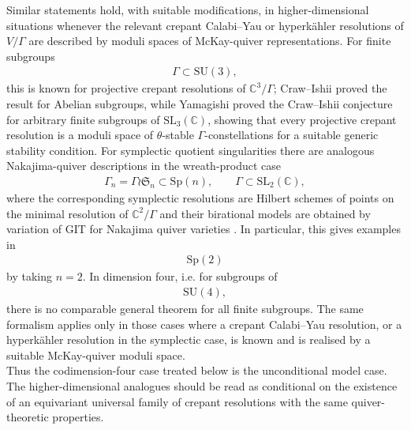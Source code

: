 \documentclass[psamsfonts]{amsart}
\theoremstyle{plain}
\theoremstyle{definition}{
\newtheorem{defi}{Definition}[section]
\newtheorem{ass}{Assumption}
\newtheorem*{nota}{Notation}}
\theoremstyle{remark}{
\newtheorem{rem}{Remark}
\newtheorem{ex}{Example}}
\theoremstyle{plain}{
\newtheorem{thm}{Theorem}[section]
\newtheorem{lem}{Lemma}[section]
\newtheorem{cor}{Corollary}[section]
\newtheorem{prop}{Proposition}[section]
\newtheorem{con}{Conjecture}[section]}
\newcommand{\m}[1]{{\mathrm{#1}}}
\begin{document}
Similar statements hold, with suitable modifications, in higher-dimensional situations whenever the relevant crepant Calabi--Yau or hyperkähler resolutions of $V/\Gamma$ are described by moduli spaces of McKay-quiver representations. For finite subgroups
\begin{align*}
\Gamma\subset \m{SU}(3),
\end{align*}
this is known for projective crepant resolutions of $\mathbb{C}^3/\Gamma$; Craw--Ishii \cite{craw2004flops} proved the result for Abelian subgroups, while Yamagishi\cite{yamagishi2025moduliI,yamagishi2025moduliII} proved the Craw--Ishii conjecture for arbitrary finite subgroups of
$\m{SL}_3(\mathbb{C})$, showing that every projective crepant resolution is a moduli space of $\theta$-stable $\Gamma$-constellations for a suitable generic stability condition. For symplectic quotient singularities there are analogous Nakajima-quiver descriptions in the wreath-product case
\begin{align*}
\Gamma_n=\Gamma\wr\mathfrak{S}_n
\subset \m{Sp}(n), \qquad \Gamma\subset \m{SL}_2(\mathbb{C}),
\end{align*}
where the corresponding symplectic resolutions are Hilbert schemes of points on the minimal resolution of $\mathbb{C}^2/\Gamma$ and their birational models are obtained by variation of GIT for Nakajima quiver varieties \cite{nakajima1994instantons,nakajima1999lectures,bellamy2018birational}. In particular, this gives examples in
\begin{align*}
\m{Sp}(2)
\end{align*}
by taking $n=2$. In dimension four, i.e. for subgroups of
\begin{align*}
\m{SU}(4),
\end{align*}
there is no comparable general theorem for all finite subgroups. The same formalism applies only in those cases where a crepant Calabi--Yau resolution, or a hyperkähler resolution in the symplectic case, is known and is realised by a suitable McKay-quiver moduli space.\\

Thus the codimension-four case treated below is the unconditional model case. The higher-dimensional analogues should be read as conditional on the existence of an equivariant universal family of crepant resolutions with the same quiver-theoretic properties.
\end{document}
